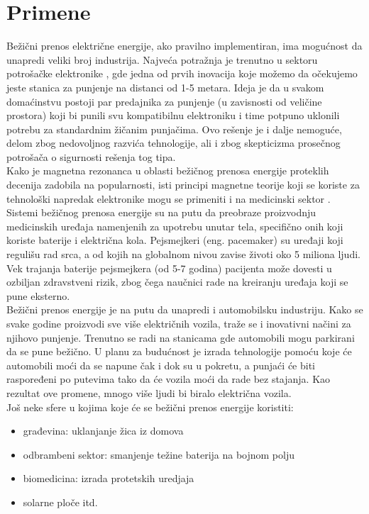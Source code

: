 \documentclass[a4paper]{article}
\begin{document}
\section{Primene}
\label{sec:Primene}
Bežični prenos električne energije, ako pravilno implementiran, ima mogućnost da unapredi veliki broj industrija. Najveća potražnja je trenutno u sektoru potrošačke elektronike \cite{a}, gde jedna od prvih inovacija koje možemo da očekujemo jeste stanica za punjenje na distanci od 1-5 metara. Ideja je da u svakom domaćinstvu postoji par predajnika za punjenje (u zavisnosti od veličine prostora) koji bi punili svu kompatibilnu elektroniku i time potpuno uklonili potrebu za standardnim žičanim punjačima. Ovo rešenje je i dalje nemoguće, delom zbog nedovoljnog razvića tehnologije, ali i zbog skepticizma prosečnog potrošača o sigurnosti rešenja tog tipa. 
\\[10pt]
Kako je magnetna rezonanca u oblasti bežičnog prenosa energije proteklih decenija zadobila na popularnosti, isti principi magnetne teorije koji se koriste za tehnološki napredak elektronike mogu se primeniti i na medicinski sektor \cite{b}. Sistemi bežičnog prenosa energije su na putu da preobraze proizvodnju medicinskih uređaja namenjenih za upotrebu unutar tela, specifično onih koji koriste baterije i električna kola. Pejsmejkeri (eng. pacemaker) su uređaji koji regulišu rad srca, a od kojih na globalnom nivou zavise životi oko 5 miliona ljudi. Vek trajanja baterije pejsmejkera (od 5-7 godina) \cite{c} pacijenta može dovesti u ozbiljan zdravstveni rizik, zbog čega naučnici rade na kreiranju uređaja koji se pune eksterno. 
\\[10pt]
Bežični prenos energije je na putu da unapredi i automobilsku industriju. Kako se svake godine proizvodi sve više električnih vozila, traže se i inovativni načini za njihovo punjenje. Trenutno se radi na stanicama gde automobili mogu parkirani da se pune bežično. U planu za budućnost je izrada tehnologije pomoću koje će automobili moći da se napune čak i dok su u pokretu, a punjaći će biti raspoređeni po putevima tako da će vozila moći da rade bez stajanja. Kao rezultat ove promene, mnogo više ljudi bi biralo električna vozila. 
\\[10pt]
Još neke sfere u kojima koje će se bežični prenos energije koristiti:
\begin{itemize}
 \item građevina: uklanjanje žica iz domova
 \item odbrambeni sektor: smanjenje težine baterija na bojnom polju
 \item biomedicina: izrada protetskih uredjaja
 \item solarne ploče itd.
\end{itemize}
\end{document}

